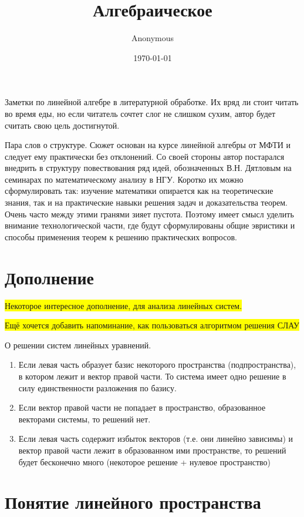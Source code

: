 \documentclass[a4paper,12pt]{article}
\author{Anonymous}
\title{Алгебраическое}
\date{\today}
\begin{document}

\maketitle

Заметки по линейной алгебре в литературной обработке. Их вряд ли стоит читать во время еды, но если читатель сочтет слог не слишком сухим, автор будет считать свою цель достигнутой. 

Пара слов о структуре. Сюжет основан на курсе линейной алгебры от МФТИ и следует ему практически без отклонений. Со своей стороны автор постарался внедрить в структуру повествования ряд идей, обозначенных В.Н. Дятловым на семинарах по математическому анализу в НГУ. Коротко их можно сформулировать так: изучение математики опирается как на теоретические знания, так и на практические навыки решения задач и доказательства теорем. Очень часто между этими гранями зияет пустота. Поэтому имеет смысл уделить внимание технологической части, где будут сформулированы  общие эвристики и способы применения теорем к решению практических вопросов.

\section{Дополнение}
\colorbox{yellow}{Некоторое интересное дополнение, для анализа линейных систем.}

\colorbox{yellow}{Ещё хочется добавить напоминание, как пользоваться алгоритмом решения СЛАУ}

О решении систем линейных уравнений. 
\begin{enumerate}
	\item Если левая часть образует базис некоторого пространства (подпространства), в котором лежит и вектор правой части. То система имеет одно решение в силу единственности разложения по базису.
	\item Если вектор правой части не попадает в пространство, образованное векторами системы, то решений нет.
	\item Если левая часть содержит избыток векторов (т.е. они линейно зависимы) и вектор правой части лежит в образованном ими пространстве, то решений будет бесконечно много (некоторое решение + нулевое пространство)
\end{enumerate}

\section{Понятие линейного пространства}
\end{document}
